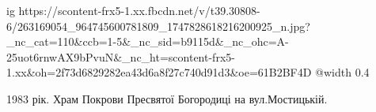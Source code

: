  
 
 
 
 

\ifcmt
  ig https://scontent-frx5-1.xx.fbcdn.net/v/t39.30808-6/263169054_964745600781809_1747828618216200925_n.jpg?_nc_cat=110&ccb=1-5&_nc_sid=b9115d&_nc_ohc=A-25uot6rnwAX9bPvuN&_nc_ht=scontent-frx5-1.xx&oh=2f73d6829282ea43d6a8f27c740d91d3&oe=61B2BF4D
  @width 0.4
\fi


1983 рік. Храм Покрови Пресвятої Богородиці на вул.Мостицькій.
